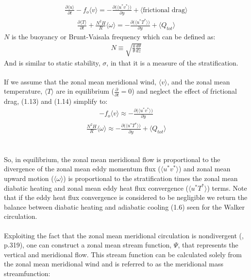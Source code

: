 \documentclass[letterpaper,12pt,titlepage,oneside,final]{book}
\begin{document}
\begin{align}
\frac{\partial{\langle{u}\rangle}}{\partial{t}} - f_{o}\langle{v}\rangle = -\frac{\partial\Big(\langle{u^{*}v^{*}}\rangle\Big)}{\partial{y}} + \langle\text{frictional drag}\rangle
\end{align}
\begin{align}
\frac{\partial{\langle{T}\rangle}}{\partial{t}} + \frac{N^{2}H}{R}\langle{\omega}\rangle = -\frac{\partial\Big(\langle{u^{*}T^{*}}\rangle\Big)}{\partial{y}} + \langle{Q_{tot}}\rangle
\end{align}
$N$ is the buoyancy or Brunt-Vaisala frequency which can be defined as: 
\begin{align}
N\equiv\sqrt{\frac{g}{\theta}\frac{d{\theta}}{dz}}
\end{align}
And is similar to static stability, $\sigma$, in that it is a measure of the stratification.
\\
\\
If we assume that the zonal mean meridional wind, $\langle{v}\rangle$, and the zonal mean temperature, $\langle{T}\rangle$ are in equilibrium ($\frac{\partial}{\partial{t}}=0$) and neglect the effect of frictional drag, (1.13) and (1.14) simplify to:
\begin{align}
-f_{o}\langle{v}\rangle \approx -\frac{\partial\Big(\langle{u^{*}v^{*}}\rangle\Big)}{\partial{y}}
\end{align}
\begin{align}
\frac{N^{2}H}{R}\langle{\omega}\rangle \approx -\frac{\partial\Big(\langle{u^{*}T^{*}}\rangle\Big)}{\partial{y}} + \langle{Q_{tot}}\rangle
\end{align}
\\
\\
So, in equilibrium, the zonal mean meridional flow is proportional to the divergence of the zonal mean eddy momentum flux ($\langle{u^{*}v^{*}}\rangle$) and zonal mean upward motion ($\langle{\omega}\rangle$) is proportional to the stratification times the zonal mean diabatic heating and zonal mean eddy heat flux convergence ($\langle{u^{*}T^{*}}\rangle$) terms. Note that if the eddy heat flux convergence is considered to be negligible we return the balance between diabatic heating and adiabatic cooling (1.6) seen for the Walker circulation. 
\\
\\
Exploiting the fact that the zonal mean meridional circulation is nondivergent (\citep{holton_introduction_2004}, p.319), one can construct a zonal mean stream function, $\Psi$, that represents the vertical and meridional flow. This stream function can be calculated solely from the zonal mean meridional wind and is referred to as the meridional mass streamfunction:
\end{document}
